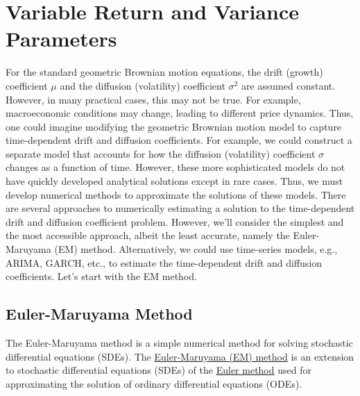 \documentclass[11pt]{article}
\theoremstyle{definition}
\begin{document}
\section*{Variable Return and Variance Parameters}
For the standard geometric Brownian motion equations, the drift (growth) coefficient $\mu$ and the diffusion (volatility) coefficient $\sigma^{2}$ are assumed constant. 
However, in many practical cases, this may not be true. For example, macroeconomic conditions may change, leading to different price dynamics. 
Thus, one could imagine modifying the geometric Brownian motion model to capture time-dependent drift and diffusion coefficients.
For example, we could construct a separate model that accounts for how the diffusion (volatility) coefficient $\sigma$ 
changes as a function of time. However, these more sophisticated models do not have quickly developed analytical solutions except in rare cases. 
Thus, we must develop numerical methods to approximate the solutions of these models. There are several approaches to numerically estimating a solution to the time-dependent drift and diffusion coefficient problem.
However, we'll consider the simplest and the most accessible approach, albeit the least accurate, 
namely the Euler-Maruyama (EM) method. 
Alternatively, we could use time-series models, e.g., ARIMA, GARCH, etc., to estimate the time-dependent drift and diffusion coefficients.
Let's start with the EM method.

\subsection*{Euler-Maruyama Method}
The Euler-Maruyama method is a simple numerical method for solving stochastic differential equations (SDEs). 
The \href{https://en.wikipedia.org/wiki/Euler–Maruyama_method}{Euler-Maruyama (EM) method}
is an extension to stochastic differential equations (SDEs) of the \href{https://en.wikipedia.org/wiki/Euler_method}{Euler method}
used for approximating the solution of ordinary differential equations (ODEs). 
\end{document}
